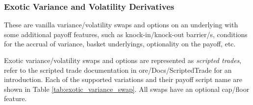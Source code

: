 \subsubsection*{Exotic Variance and Volatility Derivatives}
\label{SubSectionExoticVarianceSwap}

These are vanilla variance/volatility swaps and options on an underlying with some additional payoff features,
such as knock-in/knock-out barrier/s, conditions for the accrual of variance, basket underlyings, optionality
on the payoff, etc.

Exotic variance/volatility swaps and options are represented as {\em scripted trades},
refer to the scripted trade documentation in ore/Docs/ScriptedTrade for an introduction.
Each of the supported variations and their payoff script
name are shown in Table \ref{tab:exotic_variance_swap}. All swaps have an optional cap/floor feature.

